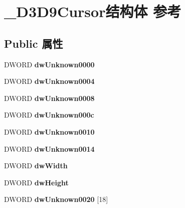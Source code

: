 \hypertarget{struct___d3_d9_cursor}{}\section{\+\_\+\+D3\+D9\+Cursor结构体 参考}
\label{struct___d3_d9_cursor}
\subsection*{Public 属性}
\begin{DoxyCompactItemize}
\item 
\mbox{\label{struct___d3_d9_cursor_afc43425519ca084b692b7fbc9f4b951c}} 
D\+W\+O\+RD {\bfseries dw\+Unknown0000}
\item 
\mbox{\label{struct___d3_d9_cursor_ab2821f499b2813af6abadab7f7b1c6f3}} 
D\+W\+O\+RD {\bfseries dw\+Unknown0004}
\item 
\mbox{\label{struct___d3_d9_cursor_a43fc9af096605268bbd96f7a6804a928}} 
D\+W\+O\+RD {\bfseries dw\+Unknown0008}
\item 
\mbox{\label{struct___d3_d9_cursor_a8e03a080b5deb52df236d3efacab8501}} 
D\+W\+O\+RD {\bfseries dw\+Unknown000c}
\item 
\mbox{\label{struct___d3_d9_cursor_a7c9d189e6542a028ab1150f880969bea}} 
D\+W\+O\+RD {\bfseries dw\+Unknown0010}
\item 
\mbox{\label{struct___d3_d9_cursor_a4706f04c355d84a548ed28dc168e1acd}} 
D\+W\+O\+RD {\bfseries dw\+Unknown0014}
\item 
\mbox{\label{struct___d3_d9_cursor_acdd841724ae7cfd0194f831204a11cb8}} 
D\+W\+O\+RD {\bfseries dw\+Width}
\item 
\mbox{\label{struct___d3_d9_cursor_a23b257d4ed669be81a761972e0826bf2}} 
D\+W\+O\+RD {\bfseries dw\+Height}
\item 
\mbox{\label{struct___d3_d9_cursor_adcd1634443e40d0427bf09f3755f360a}} 
D\+W\+O\+RD {\bfseries dw\+Unknown0020} \mbox{[}18\mbox{]}

\end{DoxyCompactItemize}
